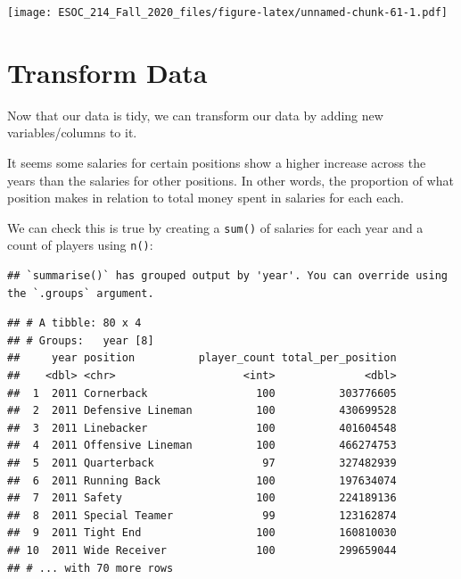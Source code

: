 \documentclass[
]{book}
\newenvironment{Shaded}{\begin{snugshade}}{\end{snugshade}}
\newcommand{\DataTypeTok}[1]{\textcolor[rgb]{0.13,0.29,0.53}{#1}}
\newcommand{\KeywordTok}[1]{\textcolor[rgb]{0.13,0.29,0.53}{\textbf{#1}}}
\newcommand{\NormalTok}[1]{#1}
\newcommand{\OperatorTok}[1]{\textcolor[rgb]{0.81,0.36,0.00}{\textbf{#1}}}
\newcommand{\StringTok}[1]{\textcolor[rgb]{0.31,0.60,0.02}{#1}}
\begin{document}
\texttt{[image: ESOC\_214\_Fall\_2020\_files/figure-latex/unnamed-chunk-61-1.pdf]}

\hypertarget{transform-data}{%
\section{Transform Data}\label{transform-data}}

Now that our data is tidy, we can transform our data by adding new variables/columns to it.

It seems some salaries for certain positions show a higher increase across the years than the salaries for other positions. In other words, the proportion of what position makes in relation to total money spent in salaries for each each.

We can check this is true by creating a \texttt{sum()} of salaries for each year and a count of players using \texttt{n()}:

\begin{Shaded}
\end{Shaded}

\begin{verbatim}
## `summarise()` has grouped output by 'year'. You can override using the `.groups` argument.
\end{verbatim}

\begin{verbatim}
## # A tibble: 80 x 4
## # Groups:   year [8]
##     year position          player_count total_per_position
##    <dbl> <chr>                    <int>              <dbl>
##  1  2011 Cornerback                 100          303776605
##  2  2011 Defensive Lineman          100          430699528
##  3  2011 Linebacker                 100          401604548
##  4  2011 Offensive Lineman          100          466274753
##  5  2011 Quarterback                 97          327482939
##  6  2011 Running Back               100          197634074
##  7  2011 Safety                     100          224189136
##  8  2011 Special Teamer              99          123162874
##  9  2011 Tight End                  100          160810030
## 10  2011 Wide Receiver              100          299659044
## # ... with 70 more rows
\end{verbatim}
\end{document}
